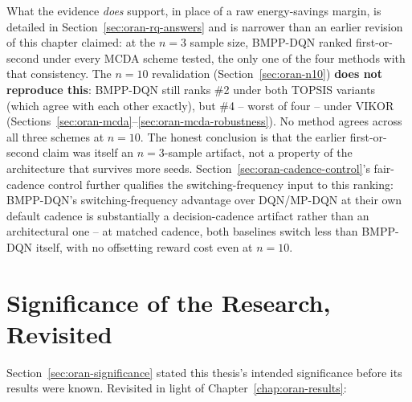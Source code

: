What the evidence \emph{does} support, in place of a raw energy-savings
margin, is detailed in Section~\ref{sec:oran-rq-answers} and is narrower
than an earlier revision of this chapter claimed: at the $n=3$ sample size,
BMPP-DQN ranked first-or-second under every MCDA scheme tested, the only
one of the four methods with that consistency. The $n=10$ revalidation
(Section~\ref{sec:oran-n10}) \textbf{does not reproduce this}: BMPP-DQN
still ranks \#2 under both TOPSIS variants (which agree with each other
exactly), but \#4 -- worst of four -- under VIKOR
(Sections~\ref{sec:oran-mcda}--\ref{sec:oran-mcda-robustness}). No method
agrees across all three schemes at $n=10$. The honest conclusion is that
the earlier first-or-second claim was itself an $n=3$-sample artifact, not
a property of the architecture that survives more seeds.
Section~\ref{sec:oran-cadence-control}'s fair-cadence control further
qualifies the switching-frequency input to this ranking: BMPP-DQN's
switching-frequency advantage over DQN/MP-DQN at their own default
cadence is substantially a decision-cadence artifact rather than an
architectural one -- at matched cadence, both baselines switch less than
BMPP-DQN itself, with no offsetting reward cost even at $n=10$.

\section{Significance of the Research, Revisited}
\label{sec:oran-significance-revisited}

Section~\ref{sec:oran-significance} stated this thesis's intended
significance before its results were known. Revisited in light of
Chapter~\ref{chap:oran-results}:

